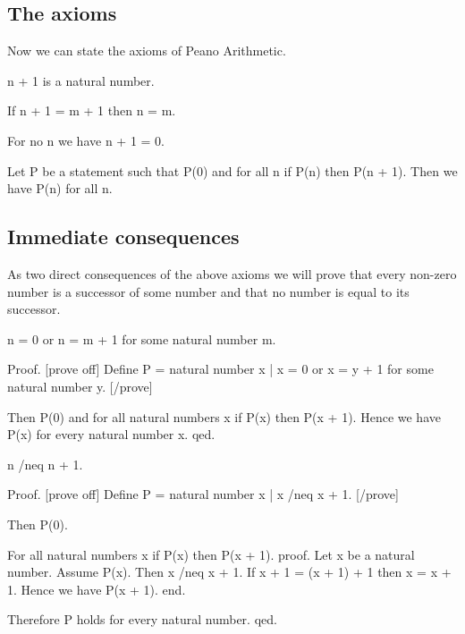 \subsection{The axioms}
Now we can state the axioms of Peano Arithmetic.

\begin{forthel}
\begin{axiom}[0105]
n + 1 is a natural number.
\end{axiom}

\begin{axiom}[0106]
If n + 1 = m + 1 then n = m.
\end{axiom}

\begin{axiom}[0107]
For no n we have n + 1 = 0.
\end{axiom}

\begin{axiom}[0108]
Let P be a statement such that P(0) and for all n if P(n) then
P(n + 1). Then we have P(n) for all n.
\end{axiom}
\end{forthel}

\subsection{Immediate consequences}
As two direct consequences of the above axioms we will prove that every non-zero
number is a successor of some number and that no number is equal to its
successor.

\begin{forthel}
\begin{proposition}[0109]
n = 0 or n = m + 1 for some natural number m.

Proof.
[prove off]
Define P = {natural number x | x = 0 or x = y + 1 for some natural number y}.
[/prove]

Then P(0) and for all natural numbers x if P(x) then P(x + 1). Hence we
have P(x) for every natural number x.
qed.
\end{proposition}

\begin{proposition}[0110]
n /neq n + 1.

Proof.
[prove off]
Define P = {natural number x | x /neq x + 1}.
[/prove]

Then P(0).

For all natural numbers x if P(x) then P(x + 1).
proof.
Let x be a natural number. Assume P(x). Then x /neq x + 1. If x + 1 =
(x + 1) + 1 then x = x + 1. Hence we have P(x + 1).
end.

Therefore P holds for every natural number.
qed.
\end{proposition}
\end{forthel}

